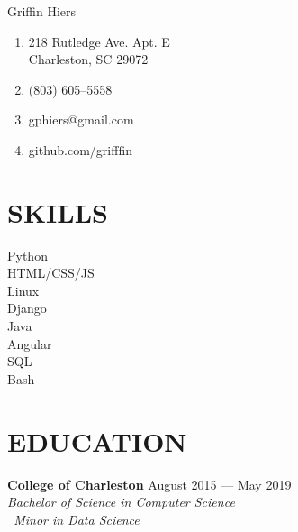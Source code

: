 \documentclass[letterpaper,14pt]{extarticle}
\begin{document}
\begin{multicols}{2}
  \vspace*{25pt}
  \huge {Grif\phantom{}f\phantom{}in Hiers}
  \normalsize \\

  \begin{enumerate}[noitemsep]
    \item[]{\faHome{} 218 Rutledge Ave. Apt. E\\Charleston, SC 29072}
    \item[]{\faPhone{} (803) 605--5558}
    \item[]{\faEnvelope{} gphiers@gmail.com}
    \item[]{\faGithub{} github.com/grifffin}
  \end{enumerate}
\end{multicols}
\vspace*{13pt}

\section*{SKILLS}
\begin{multicols}{4}
  Python\\
  HTML/CSS/JS\\
  Linux\\
  Django\\
  Java\\
  Angular\\
  SQL\\
  Bash\\
\end{multicols}

\section*{EDUCATION}
  \textbf{College of Charleston}
  \hspace*{\fill}
  \textcolor{color2}{August 2015 --- May 2019}
  \\
  \textcolor{color2}{
    \textit{
      \qquad{}Bachelor of Science in Computer Science
      \\
      \qquad{}\ Minor in Data Science
    }
  }
\end{document}
